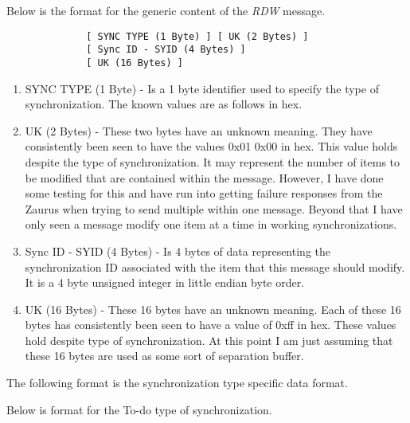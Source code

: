             Below is the format for the generic content of the \emph{RDW}
            message.

            \begin{verbatim}
              [ SYNC TYPE (1 Byte) ] [ UK (2 Bytes) ]
              [ Sync ID - SYID (4 Bytes) ]
              [ UK (16 Bytes) ]
            \end{verbatim}

            \begin{enumerate}
            \item SYNC TYPE (1 Byte) - Is a 1 byte identifier used to specify
              the type of synchronization. The known values are as 
              follows in hex.

              \synctypes

            \item UK (2 Bytes) - These two bytes have an unknown meaning. They
              have consistently been seen to have the values 0x01 0x00 in
              hex. This value holds despite the type of synchronization. It
              may represent the number of items to be modified that are
              contained within the message. However, I have done some testing
              for this and have run into getting failure responses from the
              Zaurus when trying to send multiple within one message. Beyond
              that I have only seen a message modify one item at a time in
              working synchronizations.

            \item Sync ID - SYID (4 Bytes) - Is 4 bytes of data representing
              the synchronization ID associated with the item that this
              message should modify. It is a 4 byte unsigned integer in little
              endian byte order.

            \item UK (16 Bytes) - These 16 bytes have an unknown
              meaning. Each of these 16 bytes has consistently been seen to
              have  a value of 0xff in hex. These values hold despite type of
              synchronization. At this point I am just assuming that these 16
              bytes are used as some sort of separation buffer.
            \end{enumerate}

            The following format is the synchronization type specific data
            format.

            Below is format for the To-do type of synchronization.

